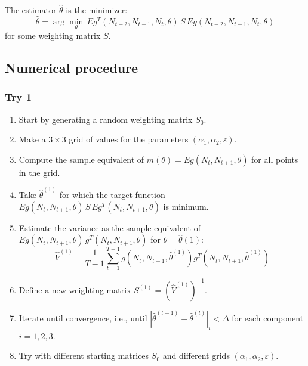     The estimator $\hat \theta$ is the minimizer:
    \begin{equation}
        \hat \theta = \arg \min_{\theta} \, E g^T(N_{t-2}, N_{t-1}, N_t, \theta)  \, S \, E g(N_{t-2}, N_{t-1}, N_t, \theta)
    \end{equation}
    for some weighting matrix $S$.

    \subsection{Numerical procedure}
    \subsubsection{Try 1}
    \begin{enumerate}
        \item Start by generating a random weighting matrix $S_0$.
        \item Make a $3\times 3$ grid of values for the parameters $(\alpha_1, \alpha_2, \varepsilon)$.
        \item Compute the sample equivalent of $m(\theta)=E g(N_t, N_{t+1}, \theta)$ for all points in the grid.
        \item Take $\hat \theta^{(1)}$ for which the target function $E g(N_t, N_{t+1}, \theta)  \, S \, E g^T(N_t, N_{t+1}, \theta)$ is minimum.
        \item Estimate the variance as the sample equivalent of $E g(N_t, N_{t+1}, \theta)  \, g^T(N_t, N_{t+1}, \theta)$ for $\theta = \hat \theta(1)$:
        \begin{equation}
            \hat V^{(1)}  = \frac{1}{T-1} \sum_{t=1}^{T-1} g(N_t, N_{t+1}, \hat \theta^{(1)}) g^T(N_t, N_{t+1}, \hat \theta^{(1)})
        \end{equation}
        \item Define a new weighting matrix $S^{(1)} = \left( \hat V^{(1)} \right)^{-1}$.
        \item Iterate until convergence, i.e., until $\left \vert \hat \theta^{(t+1)} - \hat \theta^{(t)} \right \vert_{i} < \Delta$ for each component $i=1,2,3$.
        \item Try with different starting matrices $S_0$ and different grids $(\alpha_1, \alpha_2, \varepsilon)$.
    \end{enumerate}
